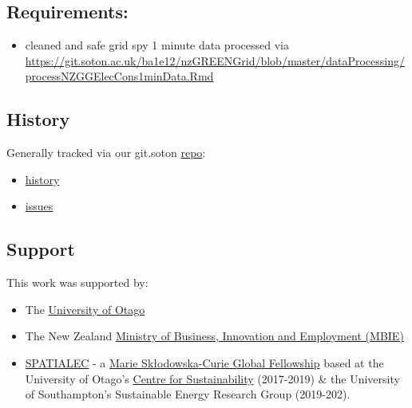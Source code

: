 \documentclass[]{article}
\providecommand{\tightlist}{%
  \setlength{\itemsep}{0pt}\setlength{\parskip}{0pt}}
\begin{document}
\subsection{Requirements:}\label{requirements}

\begin{itemize}
\tightlist
\item
  cleaned and safe grid spy 1 minute data processed via
  \url{https://git.soton.ac.uk/ba1e12/nzGREENGrid/blob/master/dataProcessing/processNZGGElecCons1minData.Rmd}
\end{itemize}

\subsection{History}\label{history}

Generally tracked via our git.soton
\href{https://git.soton.ac.uk/ba1e12/nzGREENGrid}{repo}:

\begin{itemize}
\tightlist
\item
  \href{https://git.soton.ac.uk/ba1e12/nzGREENGrid/commits/master}{history}
\item
  \href{https://git.soton.ac.uk/ba1e12/nzGREENGrid/issues}{issues}
\end{itemize}

\subsection{Support}\label{support}

This work was supported by:

\begin{itemize}
\tightlist
\item
  The \href{https://www.otago.ac.nz/}{University of Otago}
\item
  The New Zealand \href{http://www.mbie.govt.nz/}{Ministry of Business,
  Innovation and Employment (MBIE)}
\item
  \href{http://www.energy.soton.ac.uk/tag/spatialec/}{SPATIALEC} - a
  \href{http://ec.europa.eu/research/mariecurieactions/about-msca/actions/if/index_en.htm}{Marie
  Skłodowska-Curie Global Fellowship} based at the University of Otago's
  \href{http://www.otago.ac.nz/centre-sustainability/staff/otago673896.html}{Centre
  for Sustainability} (2017-2019) \& the University of Southampton's
  Sustainable Energy Research Group (2019-202).
\end{itemize}
\end{document}
